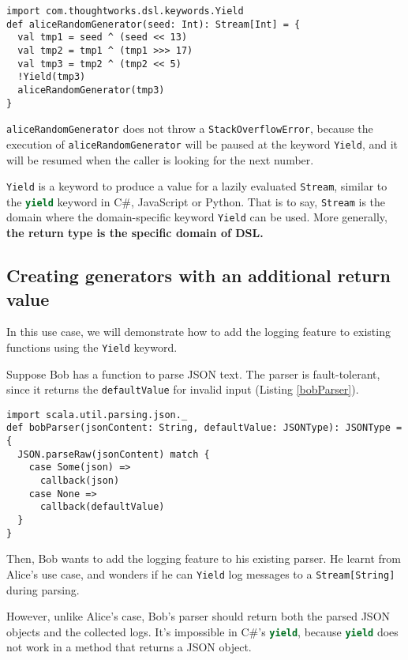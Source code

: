\begin{lstlisting}[caption={The implementation of Alice's pseudo-random number generator},label={generatedNumbers}]
import com.thoughtworks.dsl.keywords.Yield
def aliceRandomGenerator(seed: Int): Stream[Int] = {
  val tmp1 = seed ^ (seed << 13)
  val tmp2 = tmp1 ^ (tmp1 >>> 17)
  val tmp3 = tmp2 ^ (tmp2 << 5)
  !Yield(tmp3)
  aliceRandomGenerator(tmp3)
}
\end{lstlisting}

\lstinline{aliceRandomGenerator} does not throw a \lstinline{StackOverflowError}, because the execution of \lstinline{aliceRandomGenerator} will be paused at the keyword \lstinline{Yield}, and it will be resumed when the caller is looking for the next number.

\lstinline{Yield} is a keyword to produce a value for a lazily evaluated \lstinline{Stream}, similar to the \lstinline[language=Python]{yield} keyword in C\#, JavaScript or Python. That is to say, \lstinline{Stream} is the domain where the domain-specific keyword \lstinline{Yield} can be used. More generally, \textbf{the return type is the specific domain of DSL.}

\subsection{Creating generators with an additional return value}

In this use case, we will demonstrate how to add the logging feature to existing functions using the \lstinline{Yield} keyword.

Suppose Bob has a function to parse JSON text. The parser is fault-tolerant, since it returns the \lstinline{defaultValue} for invalid input  (Listing \ref{bobParser}).

\begin{lstlisting}[caption={The original implementation of Bob's parser},label={bobParser}]
import scala.util.parsing.json._
def bobParser(jsonContent: String, defaultValue: JSONType): JSONType = {
  JSON.parseRaw(jsonContent) match {
    case Some(json) =>
      callback(json)
    case None =>
      callback(defaultValue)
  }
}
\end{lstlisting}

Then, Bob wants to add the logging feature to his existing parser. He learnt from Alice's use case, and wonders if he can \lstinline{Yield} log messages to a \lstinline{Stream[String]} during parsing.

However, unlike Alice's case, Bob's parser should return both the parsed JSON objects and the collected logs. It's impossible in C\#'s \lstinline[language=Python]{yield}, because \lstinline[language=Python]{yield} does not work in a method that returns a JSON object.

